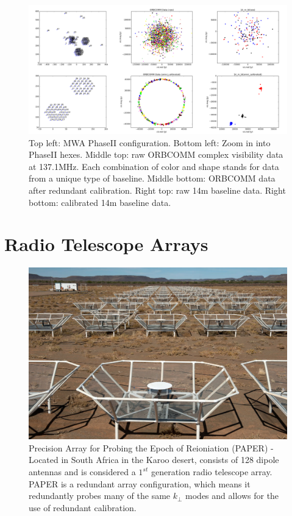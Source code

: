 \documentclass[a0,landscape]{a0poster}
\begin{document}
\begin{multicols}{4}
\begin{figure}[H]
\centering
\label{Redundant calibration on MWA PhaseII ORBCOMM data}
\includegraphics[width=0.85\linewidth]{figures/omnical_on_ORBCOMM.png}
\caption{Top left: MWA PhaseII configuration. Bottom left: Zoom in into PhaseII hexes. Middle top: raw ORBCOMM complex visibility data at 137.1MHz. Each combination of color and shape stands for data from a unique type of baseline. Middle bottom: ORBCOMM data after redundant calibration. Right top: raw 14m baseline data. Right bottom: calibrated 14m baseline data.}
\end{figure}



\section*{Radio Telescope Arrays}
\begin{figure}[H]
\centering
\label{fig:PAPER}
\includegraphics[width=0.6\linewidth]{figures/paper}
\caption{Precision Array for Probing the Epoch of Reioniation (PAPER) - Located in South Africa in the Karoo desert, consists of 128 dipole antennas and is considered a $1^{st}$ generation radio telescope array. PAPER is a redundant array configuration, which means it redundantly probes many of the same $k_\perp$ modes and allows for the use of redundant calibration.}
\end{figure}


\end{multicols}
\end{document}
